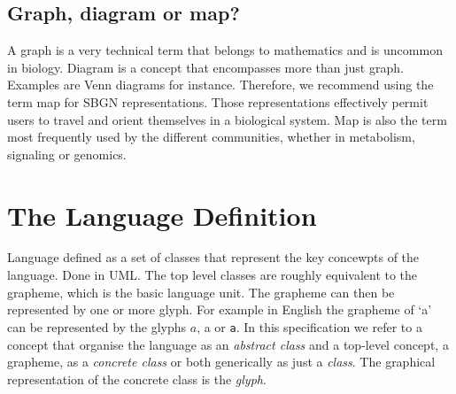 \subsection{Graph, diagram or map?}

A graph is a very technical term that belongs to mathematics and is uncommon in biology. Diagram is a concept that encompasses more than just graph. Examples are Venn diagrams for instance. Therefore, we recommend using the term map for SBGN representations. Those representations effectively permit users to travel and orient themselves in a biological system. Map is also the term most frequently used by the different communities, whether in metabolism, signaling or genomics.

\section{The Language Definition}

Language defined as a set of classes that represent the key concewpts
of the language. Done in UML. The top level classes are roughly
equivalent to the grapheme, which is the basic language unit. The
grapheme can then be represented by one or more glyph. For example in
English the grapheme of `a' can be represented by the glyphs $a$,
\textsf{a} or \texttt{a}. In this specification we refer to a concept
that organise the language as an \emph{abstract class} and a top-level
concept, \ie a grapheme, as a \emph{concrete class} or both
generically as just a \emph{class}. The graphical representation of
the concrete class is the \emph{glyph}.
